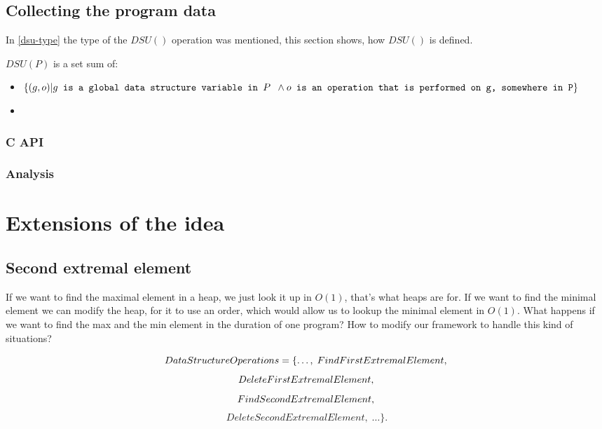 \documentclass[11pt]{article}
\begin{document}
	\subsection{Collecting the program data} \label{dsu-definition}

		In \ref{dsu-type} the type of the $DSU()$ operation was mentioned, this section shows, how $DSU()$ is
		defined.

		$DSU(P)$ is a set sum of:

		\begin{itemize}

			\item $\{(g, o) | g \texttt{ is a global data structure variable in $P$ } \wedge \\ o \texttt{
				is an operation that is performed on g, somewhere in P} \}$

			\item

		\end{itemize}

		\subsubsection{C API}

		\subsubsection{Analysis}

\pagebreak

\section{Extensions of the idea}

	\subsection{Second extremal element}

		If we want to find the maximal element in a heap, we just look it up in $O(1)$, that's what heaps are
		for.  If we want to find the minimal element we can modify the heap, for it to use an order, which would
		allow us to lookup the minimal element in $O(1)$.  What happens if we want to find the max and the min
		element in the duration of one program?  How to modify our framework to handle this kind of situations?

		$$DataStructureOperations = \{\dots, \; FindFirstExtremalElement,\\$$
		$$ DeleteFirstExtremalElement,\\$$
		$$ FindSecondExtremalElement,\\$$
		$$ DeleteSecondExtremalElement, \; \dots\}.$$
\end{document}
